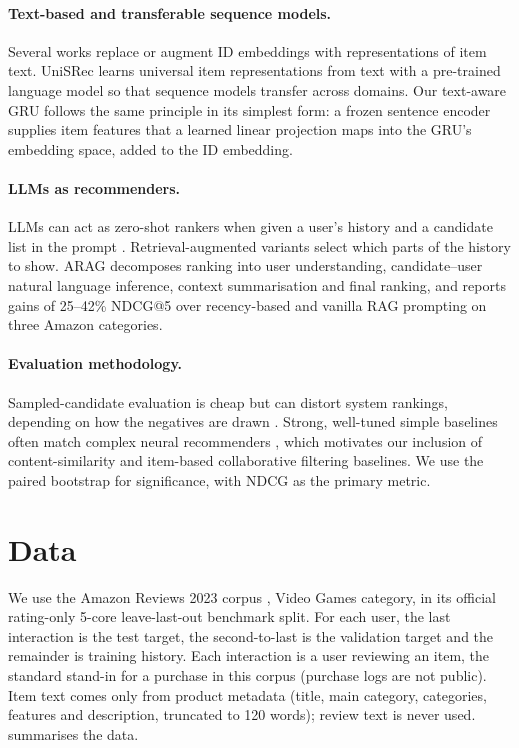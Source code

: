 \documentclass[11pt,a4paper]{article}
\begin{document}
\paragraph{Text-based and transferable sequence models.} Several works replace or augment ID
embeddings with representations of item text. UniSRec \citep{hou2022unisrec} learns universal
item representations from text with a pre-trained language model so that sequence models
transfer across domains. Our text-aware GRU follows the same principle in its simplest form: a
frozen sentence encoder \citep{reimers2019sentence,wang2020minilm} supplies item features that a
learned linear projection maps into the GRU's embedding space, added to the ID embedding.

\paragraph{LLMs as recommenders.} LLMs can act as zero-shot rankers when given a user's history
and a candidate list in the prompt \citep{hou2024llmrank}. Retrieval-augmented variants select
which parts of the history to show. ARAG \citep{maragheh2025arag} decomposes ranking into
user understanding, candidate--user natural language inference, context summarisation and final
ranking, and reports gains of 25--42\% NDCG@5 over recency-based and vanilla RAG prompting on
three Amazon categories.

\paragraph{Evaluation methodology.} Sampled-candidate evaluation is cheap but can distort
system rankings, depending on how the negatives are drawn \citep{krichene2020sampled}. Strong,
well-tuned simple baselines often match complex neural recommenders
\citep{dacrema2019really}, which motivates our inclusion of content-similarity and
item-based collaborative filtering \citep{sarwar2001item} baselines. We use the paired bootstrap
\citep{efron1993bootstrap} for significance, with NDCG \citep{jarvelin2002cumulated} as the
primary metric.

\section{Data}
\label{sec:data}

We use the Amazon Reviews 2023 corpus \citep{hou2024bridging}, Video Games category, in its
official rating-only 5-core leave-last-out benchmark split. For each user, the last interaction
is the test target, the second-to-last is the validation target and the remainder is training
history. Each interaction is a user reviewing an item, the standard stand-in for a purchase
in this corpus (purchase logs are not public). Item text comes only from product metadata (title, main category, categories,
features and description, truncated to 120 words); review text is never used.
 summarises the data.
\end{document}
